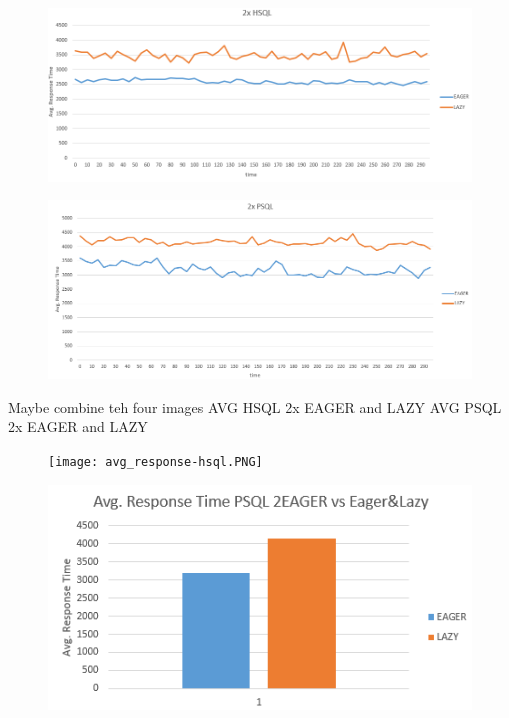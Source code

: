 \begin{figure}
    \centering
    \begin{minipage}{.5\textwidth}
      \centering
      \includegraphics[width=.9\linewidth]{Figures/2hsql.PNG}
      \label{fig:2hsql}
    \end{minipage}%
    \begin{minipage}{.5\textwidth}
      \centering
      \includegraphics[width=.9\linewidth]{Figures/PSQL.PNG}
      \label{fig:2psql}
    \end{minipage}
    \end{figure}

Maybe combine teh four images
AVG HSQL 2x EAGER and LAZY
AVG PSQL 2x EAGER and LAZY
\begin{figure}
    \centering
    \begin{minipage}{.5\textwidth}
      \centering
      \texttt{[image: avg\_response-hsql.PNG]}
      \label{fig:test1}
    \end{minipage}%
    \begin{minipage}{.5\textwidth}
      \centering
      \includegraphics[width=.9\linewidth]{Figures/abg_response-psql.PNG}
      \label{fig:test2}
    \end{minipage}
    \end{figure}



